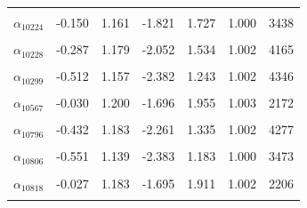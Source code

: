 \begin{longtable}{lrrrrrr}
\cellcolor{gray!10}{$\alpha_{10220}$} & \cellcolor{gray!10}{-0.231} & \cellcolor{gray!10}{1.135} & \cellcolor{gray!10}{-1.920} & \cellcolor{gray!10}{1.571} & \cellcolor{gray!10}{1.002} & \cellcolor{gray!10}{3872}\\
$\alpha_{10224}$ & -0.150 & 1.161 & -1.821 & 1.727 & 1.000 & 3438\\
\cellcolor{gray!10}{$\alpha_{10226}$} & \cellcolor{gray!10}{-0.294} & \cellcolor{gray!10}{1.149} & \cellcolor{gray!10}{-1.999} & \cellcolor{gray!10}{1.569} & \cellcolor{gray!10}{1.003} & \cellcolor{gray!10}{4593}\\
$\alpha_{10228}$ & -0.287 & 1.179 & -2.052 & 1.534 & 1.002 & 4165\\
\cellcolor{gray!10}{$\alpha_{10240}$} & \cellcolor{gray!10}{-0.027} & \cellcolor{gray!10}{1.191} & \cellcolor{gray!10}{-1.712} & \cellcolor{gray!10}{1.901} & \cellcolor{gray!10}{1.001} & \cellcolor{gray!10}{2088}\\
$\alpha_{10299}$ & -0.512 & 1.157 & -2.382 & 1.243 & 1.002 & 4346\\
\cellcolor{gray!10}{$\alpha_{10326}$} & \cellcolor{gray!10}{-0.248} & \cellcolor{gray!10}{1.159} & \cellcolor{gray!10}{-1.949} & \cellcolor{gray!10}{1.596} & \cellcolor{gray!10}{0.999} & \cellcolor{gray!10}{4035}\\
$\alpha_{10567}$ & -0.030 & 1.200 & -1.696 & 1.955 & 1.003 & 2172\\
\cellcolor{gray!10}{$\alpha_{10795}$} & \cellcolor{gray!10}{-0.414} & \cellcolor{gray!10}{1.161} & \cellcolor{gray!10}{-2.162} & \cellcolor{gray!10}{1.389} & \cellcolor{gray!10}{1.003} & \cellcolor{gray!10}{3985}\\
$\alpha_{10796}$ & -0.432 & 1.183 & -2.261 & 1.335 & 1.002 & 4277\\
\cellcolor{gray!10}{$\alpha_{10804}$} & \cellcolor{gray!10}{-0.446} & \cellcolor{gray!10}{1.215} & \cellcolor{gray!10}{-2.284} & \cellcolor{gray!10}{1.360} & \cellcolor{gray!10}{1.004} & \cellcolor{gray!10}{3989}\\
$\alpha_{10806}$ & -0.551 & 1.139 & -2.383 & 1.183 & 1.000 & 3473\\
\cellcolor{gray!10}{$\alpha_{10809}$} & \cellcolor{gray!10}{-0.475} & \cellcolor{gray!10}{1.183} & \cellcolor{gray!10}{-2.267} & \cellcolor{gray!10}{1.306} & \cellcolor{gray!10}{1.001} & \cellcolor{gray!10}{3537}\\
$\alpha_{10818}$ & -0.027 & 1.183 & -1.695 & 1.911 & 1.002 & 2206\\
\cellcolor{gray!10}{$\alpha_{10824}$} & \cellcolor{gray!10}{-0.448} & \cellcolor{gray!10}{1.127} & \cellcolor{gray!10}{-2.229} & \cellcolor{gray!10}{1.226} & \cellcolor{gray!10}{1.002} & \cellcolor{gray!10}{4244}\\

\end{longtable}
